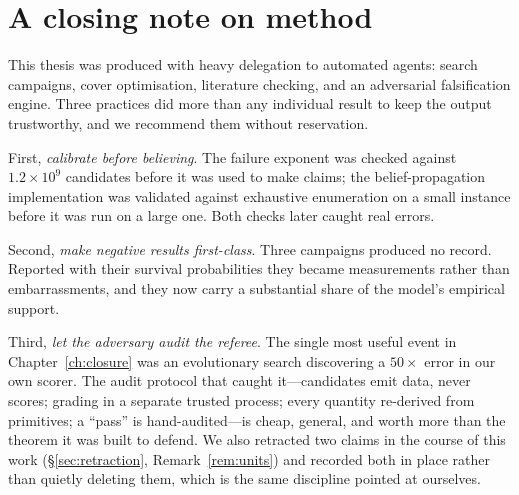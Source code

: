 \section{A closing note on method}

This thesis was produced with heavy delegation to automated agents: search
campaigns, cover optimisation, literature checking, and an adversarial
falsification engine. Three practices did more than any individual result to
keep the output trustworthy, and we recommend them without reservation.

First, \emph{calibrate before believing}. The failure exponent was checked
against $1.2\times10^{9}$ candidates before it was used to make claims; the
belief-propagation implementation was validated against exhaustive enumeration
on a small instance before it was run on a large one. Both checks later caught
real errors.

Second, \emph{make negative results first-class}. Three campaigns produced no
record. Reported with their survival probabilities they became measurements
rather than embarrassments, and they now carry a substantial share of the
model's empirical support.

Third, \emph{let the adversary audit the referee}. The single most useful event
in Chapter~\ref{ch:closure} was an evolutionary search discovering a $50\times$
error in our own scorer. The audit protocol that caught it---candidates emit
data, never scores; grading in a separate trusted process; every quantity
re-derived from primitives; a ``pass'' is hand-audited---is cheap, general, and
worth more than the theorem it was built to defend. We also retracted two claims
in the course of this work (\S\ref{sec:retraction}, Remark~\ref{rem:units}) and
recorded both in place rather than quietly deleting them, which is the same
discipline pointed at ourselves.

